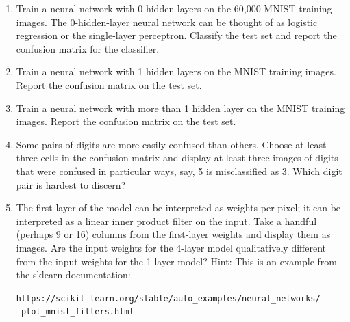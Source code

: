 \documentclass[12pt]{book}
\theoremstyle{definition}
\begin{document}
\begin{enumerate}

\item
Train a neural network with 0 hidden layers on the 60,000 MNIST training images.  The 0-hidden-layer neural network can be thought of as logistic regression or the single-layer perceptron.
Classify the test set and report the confusion matrix for the classifier.

\item
Train a neural network with 1 hidden layers on the MNIST training images.  Report the confusion matrix on the test set.

\item
Train a neural network with more than 1 hidden layer on the MNIST training images.  Report the confusion matrix on the test set.

\item
Some pairs of digits are more easily confused than others.  Choose at least three cells in the confusion matrix and display at least three images of digits that were confused in particular ways,  say, 5 is misclassified as 3.   Which digit pair is hardest to discern?  

\item 
The first layer of the model can be interpreted as weights-per-pixel; it can be interpreted as a linear inner product filter on the input.   
Take a handful (perhaps 9 or 16) columns from the first-layer weights and display them as images.  Are the input weights for the 4-layer model qualitatively different from the input weights for the 1-layer model?
Hint:  This is an example from the sklearn documentation:

\texttt{https://scikit-learn.org/stable/auto\_examples/neural\_networks/ \
plot\_mnist\_filters.html}

\end{enumerate}
\end{document}
